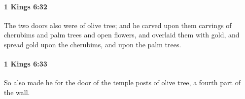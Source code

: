 		\paragraph{1 Kings 6:32} %
			\label{1KINGS-6-32}

			The two doors also were of olive tree; and he carved upon them carvings of cherubims and palm trees and open flowers, and overlaid them with gold, and spread gold upon the cherubims, and upon the palm trees.


		\paragraph{1 Kings 6:33} %
			\label{1KINGS-6-33}

			So also made he for the door of the temple posts of olive tree, a fourth part of the wall.



